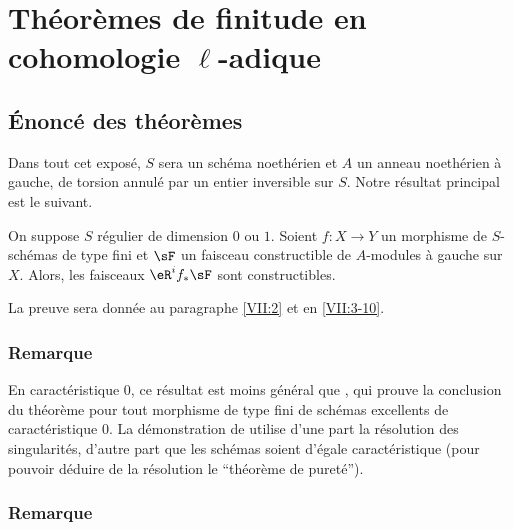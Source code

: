 

\chapter{Théorèmes de finitude en cohomologie \texorpdfstring{$\ell$}{l}-adique}\label{VII}










\section{Énoncé des théorèmes}\label{VII:1}

Dans tout cet exposé, $S$ sera un schéma noethérien et $A$ un anneau 
noethérien à gauche, de torsion annulé par un entier inversible sur $S$. 
Notre résultat principal est le suivant. 





\begin{theorem_}\label{VII:1-1}
On suppose $S$ régulier de dimension $0$ ou $1$. Soient $f:X\to Y$ un 
morphisme de $S$-schémas de type fini et $\sF$ un faisceau constructible de 
$A$-modules à gauche sur $X$. Alors, les faisceaux $\eR^i f_\ast \sF$ sont 
constructibles. 
\end{theorem_}

La preuve sera donnée au paragraphe \ref{VII:2} et en \ref{VII:3-10}. 





\subsection{Remarque}\label{VII:1-2}

En caractéristique $0$, ce résultat est moins général que 
\cite[XIX paragraphe 5]{sga4}, qui prouve la conclusion du théorème pour 
tout morphisme de type fini de schémas excellents de caractéristique $0$. 
La démonstration de \cite[XIX]{sga4} utilise d'une part la résolution des  
singularités, d'autre part que les schémas soient d'égale 
caractéristique (pour pouvoir déduire de la résolution le ``théorème 
de pureté''). 






\subsection{Remarque}\label{VII:1-3}

